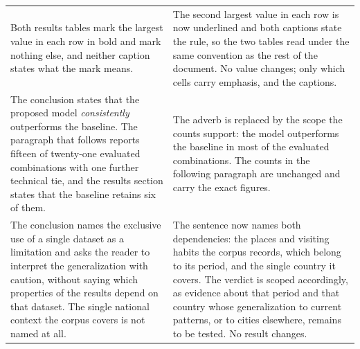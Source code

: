 \begin{table}[htb]
\begin{tabular}{@{}p{}p{}@{}}
Both results tables mark the largest value in each row in bold and mark nothing else, and
neither caption states what the mark means. &
The second largest value in each row is now underlined and both captions state the rule, so
the two tables read under the same convention as the rest of the document. No value
changes; only which cells carry emphasis, and the captions. \\
\addlinespace
The conclusion states that the proposed model \emph{consistently} outperforms the
baseline. The paragraph that follows reports fifteen of twenty-one evaluated combinations
with one further technical tie, and the results section states that the baseline retains
six of them. &
The adverb is replaced by the scope the counts support: the model outperforms the baseline
in most of the evaluated combinations. The counts in the following paragraph are unchanged
and carry the exact figures. \\
\addlinespace
The conclusion names the exclusive use of a single dataset as a limitation and asks the
reader to interpret the generalization with caution, without saying which properties of
the results depend on that dataset. The single national context the corpus covers is not
named at all. &
The sentence now names both dependencies: the places and visiting habits the corpus
records, which belong to its period, and the single country it covers. The verdict is
scoped accordingly, as evidence about that period and that country whose generalization to
current patterns, or to cities elsewhere, remains to be tested. No result changes. \\
\bottomrule
\end{tabular}
\end{table}
